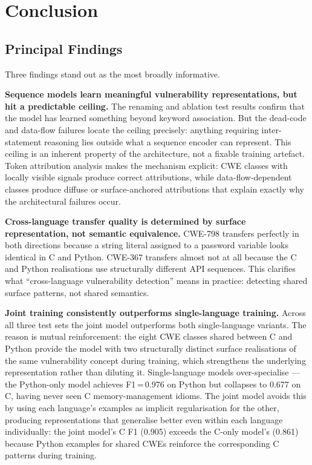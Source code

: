 \chapter{Conclusion}
\label{ch:conclusion}

\section{Principal Findings}

Three findings stand out as the most broadly informative.

\textbf{Sequence models learn meaningful vulnerability representations, but hit a predictable ceiling.}
The renaming and ablation test results confirm that the model has learned something beyond
keyword association.
But the dead-code and data-flow failures locate the ceiling precisely: anything requiring
inter-statement reasoning lies outside what a sequence encoder can represent.
This ceiling is an inherent property of the architecture, not a fixable training artefact.
Token attribution analysis makes the mechanism explicit: CWE classes with locally visible
signals produce correct attributions, while data-flow-dependent classes produce diffuse or
surface-anchored attributions that explain exactly why the architectural failures occur.

\textbf{Cross-language transfer quality is determined by surface representation, not semantic equivalence.}
CWE-798 transfers perfectly in both directions because a string literal assigned to a
password variable looks identical in C and Python.
CWE-367 transfers almost not at all because the C and Python realisations use structurally
different API sequences.
This clarifies what ``cross-language vulnerability detection'' means in practice:
detecting shared surface patterns, not shared semantics.

\textbf{Joint training consistently outperforms single-language training.}
Across all three test sets the joint model outperforms both single-language variants.
The reason is mutual reinforcement: the eight CWE classes shared between C and Python
provide the model with two structurally distinct surface realisations of the same
vulnerability concept during training, which strengthens the underlying representation
rather than diluting it.
Single-language models over-specialise --- the Python-only model achieves F1\,=\,0.976
on Python but collapses to 0.677 on C, having never seen C memory-management idioms.
The joint model avoids this by using each language's examples as implicit regularisation
for the other, producing representations that generalise better even within each language
individually: the joint model's C F1 (0.905) exceeds the C-only model's (0.861) because
Python examples for shared CWEs reinforce the corresponding C patterns during training.

